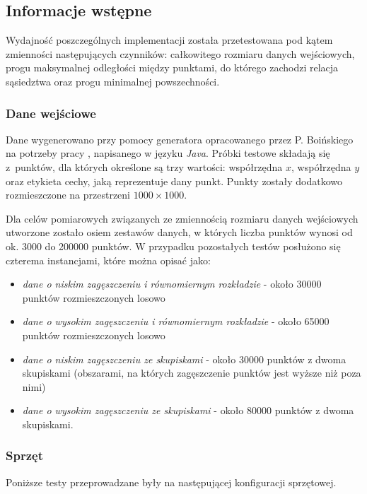 \documentclass[12pt]{article}
\begin{document}
\subsection{Informacje wstępne}

Wydajność poszczególnych implementacji została przetestowana pod kątem zmienności następujących czynników: całkowitego rozmiaru danych wejściowych, progu maksymalnej odległości między punktami, do którego zachodzi relacja sąsiedztwa oraz progu minimalnej powszechności.

\subsubsection{Dane wejściowe}

Dane wygenerowano przy pomocy generatora opracowanego przez P. Boińskiego na potrzeby pracy \cite{boinski}, napisanego w języku \textit{Java}. Próbki testowe składają się z~punktów, dla których określone są trzy wartości: współrzędna $ x $, współrzędna $ y $ oraz etykieta cechy, jaką reprezentuje dany punkt. Punkty zostały dodatkowo rozmieszczone na przestrzeni $ 1000 \times 1000$. 

Dla celów pomiarowych związanych ze zmiennością rozmiaru danych wejściowych utworzone zostało osiem zestawów danych, w których liczba punktów wynosi od ok. 3000 do 200000 punktów. W przypadku pozostałych testów posłużono się czterema instancjami, które można opisać jako:

\begin{itemize}
\item \textit{dane o niskim zagęszczeniu i równomiernym rozkładzie} - około 30000 punktów rozmieszczonych losowo
\item \textit{dane o wysokim zagęszczeniu i równomiernym rozkładzie} - około 65000 punktów rozmieszczonych losowo
\item \textit{dane o niskim zagęszczeniu ze skupiskami} - około 30000 punktów z dwoma skupiskami (obszarami, na których zagęszczenie punktów jest wyższe niż poza nimi)
\item \textit{dane o wysokim zagęszczeniu ze skupiskami} - około 80000 punktów z dwoma skupiskami.
\end{itemize}

\subsubsection{Sprzęt}

Poniższe testy przeprowadzane były na następującej konfiguracji sprzętowej. 
\end{document}
